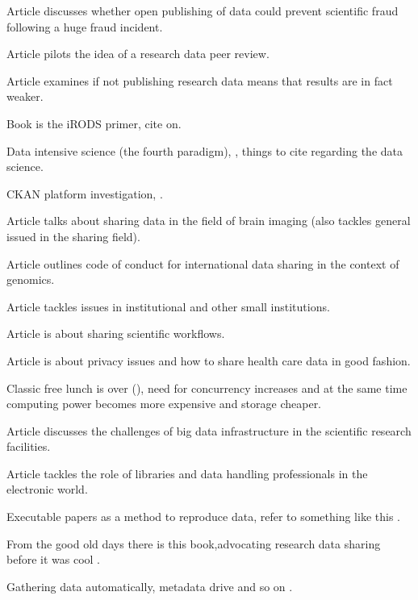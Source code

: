 Article \cite{DBLP:journals/ijdc/DoornDH13} discusses whether open publishing
of data could prevent scientific fraud following a huge fraud incident.

Article \cite{DBLP:journals/ijdc/GrootveldE12} pilots the idea of a research
data peer review.

Article \cite{wicherts2011willingness} examines if not publishing research data
means that results are in fact weaker.

Book \cite{DBLP:series/synthesis/2010Rajasekar} is the iRODS primer, cite
on.

Data intensive science (the fourth paradigm), \cite{DBLP:books/ms/4paradigm09},
things to cite regarding the data science.

CKAN platform investigation, \cite{winn2013open}.

Article \cite{DBLP:journals/fini/PolineBGGHHHHKMPSAK12} talks about sharing
data in the field of brain imaging (also tackles general issued in the sharing
field).

Article \cite{knoppers2011towards} outlines code of conduct for international
data sharing in the context of genomics.

Article \cite{cragin2010data} tackles issues in institutional and other small
institutions.

Article \cite{DBLP:journals/fgcs/RoureGS09} is about sharing scientific
workflows.

Article \cite{kaye2012tension} is about privacy issues and how to share
health care data in good fashion.

Classic free lunch is over (\cite{sutter2005free}), need for concurrency
increases and at the same time computing power becomes more expensive and
storage cheaper.

Article \cite{DBLP:conf/cloudcom/DemchenkoZGWL12} discusses the challenges
of big data infrastructure in the scientific research facilities.

Article \cite{hjorland2014curating} tackles the role of libraries and data
handling professionals in the electronic world.

Executable papers as a method to reproduce data, refer to something like
this \cite{DBLP:journals/procedia/GorpM11}.

From the good old days there is this book,advocating research data sharing
before it was cool \cite{fienberg1985sharing}.

Gathering data automatically, metadata drive and so on
\cite{DBLP:journals/jbi/HarrisTTPGC09}.

